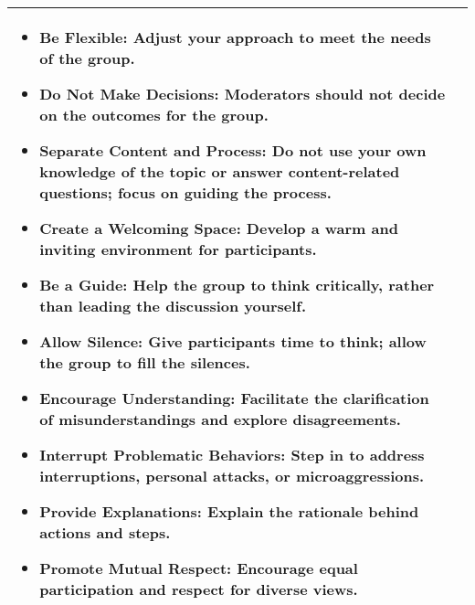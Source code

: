 \begin{longtable}{|p{2.5cm}|p{10cm}|}
\begin{itemize}[noitemsep, nosep]
        \item \textbf{Be Flexible}: Adjust your approach to meet the needs of the group.
        \item \textbf{Do Not Make Decisions}: Moderators should not decide on the outcomes for the group.
        \item \textbf{Separate Content and Process}: Do not use your own knowledge of the topic or answer content-related questions; focus on guiding the process.
        \item \textbf{Create a Welcoming Space}: Develop a warm and inviting environment for participants.
        \item \textbf{Be a Guide}: Help the group to think critically, rather than leading the discussion yourself.
        \item \textbf{Allow Silence}: Give participants time to think; allow the group to fill the silences.
        \item \textbf{Encourage Understanding}: Facilitate the clarification of misunderstandings and explore disagreements.
        \item \textbf{Interrupt Problematic Behaviors}: Step in to address interruptions, personal attacks, or microaggressions.
        \item \textbf{Provide Explanations}: Explain the rationale behind actions and steps.
        \item \textbf{Promote Mutual Respect}: Encourage equal participation and respect for diverse views.
    \end{itemize} \\
    \hline
\end{longtable}

